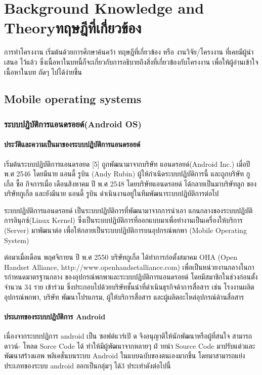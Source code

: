 \chapter{\ifenglish Background Knowledge and Theory\else ทฤษฎีที่เกี่ยวข้อง\fi}
การทําโครงงาน เริ่มต้นด้วยการศึกษาค้นคว้า ทฤษฎีที่เกี่ยวข้อง หรือ งานวิจัย/โครงงาน ที่เคยมีผู้นําเสนอ
ไว้แล้ว ซึ่งเนื้อหาในบทนี้ก็จะเกี่ยวกับการอธิบายถึงสิ่งที่เกี่ยวข้องกับโครงงาน เพื่อให้ผู้อ่านเข้าใจเนื้อหาในบท
ถัดๆ ไปได้ง่ายขึ้น
\section{Mobile operating systems}
\subsection{ระบบปฎิบัติการแอนดรอยด์(Android OS)}

\subsubsection{ประวัติและความเป็นมาของระบบปฏิบัติการแอนดรอยด์}

เริ่มต้นระบบปฏิบัติการแอนดรอยด [5] ถูกพัฒนามาจากบริษัท แอนดรอยด์(Android Inc.) เมื่อปี
พ.ศ 2546 โดยมีนาย แอนดี้ รูบิน (Andy Rubin) ผู้ให้กําเนิดระบบปฏิบัติการนี้ และถูกบริษัท กูเกิ้ล ซื้อ
กิจการเมื่อ เดือนสิงหาคม ปี พ.ศ 2548 โดยบริษัทแอนดรอยด์ ได้กลายเป็นมาบริษัทลูก ของบริษัทกูเกิ้ล
และยังมีนาย แอนดี้ รูบิน ดําเนินงานอยู่ในทีมพัฒนาระบบปฏิบัติการต่อไป

ระบบปฏิบัติการแอนดรอยด์ เป็นระบบปฏิบัติการที่พัฒนามาจากการนําเอา แกนกลางของระบบปฏิบัติ
การลินุกซ์(Linux Kernel) ซึ่งเป็นระบบปฏิบัติการที่ออกแบบมาเพื่อทํางานเป็นเครื่องให้บริการ (Server)
มาพัฒนาต่อ เพื่อให้กลายเป็นระบบปฏิบัติการบนอุปกรณ์พกพา (Mobile Operating System)

ต่อมาเมื่อเดือน พฤศจิกายน ปี พ.ศ 2550 บริษัทกูเกิ้ล ได้ทําการก่อตั้งสมาคม OHA (Open Handset Alliance, http://www.openhandsetalliance.com) เพื่อเป็นหน่วยงานกลางในการกําหนดมาตรฐานกลาง ของอุปกรณ์พกพาและระบบปฏิบัติการแอนดรอยด์ โดยมีสมาชิกในช่วงก่อนตั้งจํานวน 34 ราย
เข้าร่วม ซึ่งประกอบไปด้วยบริษัทชั้นนําที่ดําเนินธุรกิจด้าการสื่อสาร เช่น โรงงานผลิตอุปกรณ์พกพา, บริษัท
พัฒนาโปรแกรม, ผู้ให้บริการสื่อสาร และผู้ผลิตอะไหล่อุปกรณ์ด้านสื่อสาร


\subsubsection{ประเภทของระบบปฎิบัติการ Android}
เนื่องจากระบบปฎิการ android เป็น ซอฟต์แวร์เปิ ด จึงอนุญาติให้นักพัฒนาหรือผู้ที่สนใจ สามารถดาวน์-
โหลด Sorce Code ได้ ทําให้มีผู้พัฒนาจากหลายๆ ฝ่ ายนํา Source Code มาปรับแต่วและพัฒนาสร้างแอพ
พลิเคชั่นบนระบบ Android ในแบบฉบับของตนเองมากขึ้น โดยมาสามารถแย่งประเภทของระบบ android
ออกเป็นกลุ่มๆ ได้3 ประเทําดังต่อไปนี้

